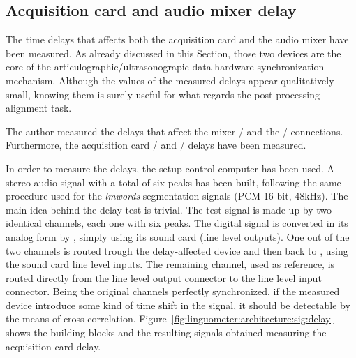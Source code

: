 \subsection{Acquisition card and audio mixer delay}
\label{sec:linguometer:technical:delay}
The time delays that affects both the acquisition card and the 
audio mixer have been measured.
As already discussed in this Section, those two devices are the core of the
articulographic/ultrasonograpic data hardware synchronization mechanism.
Although the values of the measured delays appear qualitatively small, knowing 
them is surely useful for what regards the post-processing alignment task.

The author measured the delays that affect the  mixer
/ and the
/ connections.
Furthermore, the   acquisition card
/ and
/ delays have been measured.

In order to measure the delays, the setup control computer  has been 
used.
A stereo audio signal with a total of six peaks has been built, 
following the same procedure used for the \emph{lmwords} segmentation signals
(PCM 16 bit, 48kHz).
The main idea behind the delay test is trivial. The test signal is made up by
two identical channels, each one with six peaks.
The digital signal is converted in its analog form by , simply using
its sound card (line level outputs).
One out of the two channels is routed trough the delay-affected device and then
back to , using the sound card line level inputs.
The remaining channel, used as reference, is routed directly
from the line level output connector to the line level input connector.
Being the original channels perfectly synchronized, if the measured device
introduce some kind of time shift in the signal, it should be detectable by the
means of cross-correlation.
Figure~\ref{fig:linguometer:architecture:sig:delay} shows the building blocks
and the resulting signals obtained measuring the acquisition card delay.

